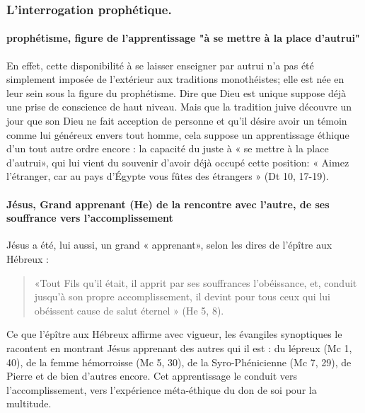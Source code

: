\subsubsection{L'interrogation prophétique.}

\paragraph{prophétisme, figure de l'apprentissage "à se mettre à la place d'autrui"}
En effet, cette disponibilité à se laisser enseigner par autrui n'a pas été simplement imposée de l'extérieur aux traditions monothéistes; elle est née en leur sein sous la figure du prophétisme. Dire que Dieu est unique suppose déjà une prise de conscience de haut niveau. Mais que la tradition juive découvre un jour que son Dieu ne fait acception de personne et qu'il désire avoir un témoin comme lui généreux envers tout homme, cela suppose un apprentissage éthique d'un tout autre ordre encore : la capacité du juste à « se mettre à la place d'autrui», qui lui vient du souvenir d'avoir déjà occupé cette position: « Aimez l'étranger, car au pays d'Égypte vous fûtes des étrangers » (Dt 10, 17-19).
\paragraph{Jésus, Grand apprenant (He) de la rencontre avec l'autre, de ses souffrance vers l'accomplissement}
Jésus a été, lui aussi, un grand « apprenant», selon les dires de l'épître aux Hébreux : \begin{quote}
    «Tout Fils qu'il était, il apprit par ses souffrances l'obéissance, et, conduit jusqu'à son propre accomplissement, il devint pour tous ceux qui lui obéissent cause de salut éternel » (He 5, 8).
\end{quote} 
Ce que l'épître aux Hébreux affirme avec vigueur, les évangiles synoptiques le racontent en montrant Jésus apprenant des autres qui il est : du lépreux (Mc 1, 40), de la femme hémorroisse (Mc 5, 30), de la Syro-Phénicienne (Mc 7, 29), de Pierre et de bien d'autres encore.
Cet apprentissage le conduit vers l'accomplissement, vers l'expérience méta-éthique du don de soi pour la multitude.


